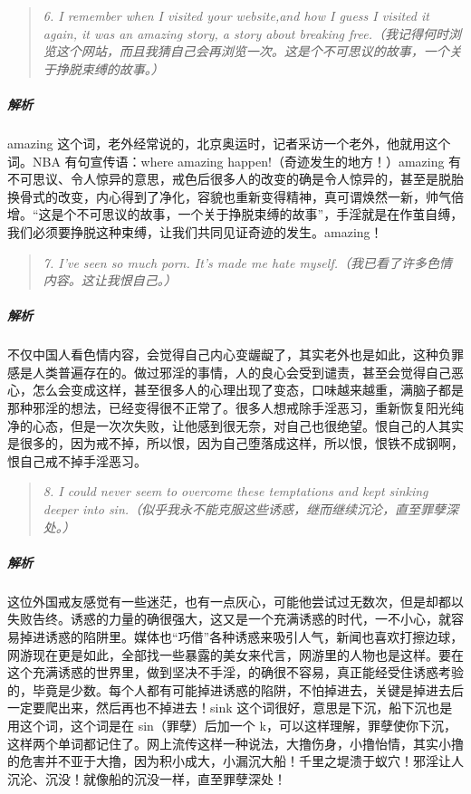 \begin{quote}\it
    6. I remember when I visited your website,and how I guess I visited it again, it was an amazing story, a story about breaking free.（我记得何时浏览这个网站，而且我猜自己会再浏览一次。这是个不可思议的故事，一个关于挣脱束缚的故事。）
\end{quote}

\subparagraph{解析} amazing 这个词，老外经常说的，北京奥运时，记者采访一个老外，他就用这个词。NBA 有句宣传语：where amazing happen!（奇迹发生的地方！）amazing 有不可思议、令人惊异的意思，戒色后很多人的改变的确是令人惊异的，甚至是脱胎换骨式的改变，内心得到了净化，容貌也重新变得精神，真可谓焕然一新，帅气倍增。“这是个不可思议的故事，一个关于挣脱束缚的故事”，手淫就是在作茧自缚，我们必须要挣脱这种束缚，让我们共同见证奇迹的发生。amazing！

\begin{quote}\it
    7. I've seen so much porn. It's made me hate myself.（我已看了许多色情内容。这让我恨自己。）
\end{quote}

\subparagraph{解析} 不仅中国人看色情内容，会觉得自己内心变龌龊了，其实老外也是如此，这种负罪感是人类普遍存在的。做过邪淫的事情，人的良心会受到谴责，甚至会觉得自己恶心，怎么会变成这样，甚至很多人的心理出现了变态，口味越来越重，满脑子都是那种邪淫的想法，已经变得很不正常了。很多人想戒除手淫恶习，重新恢复阳光纯净的心态，但是一次次失败，让他感到很无奈，对自己也很绝望。恨自己的人其实是很多的，因为戒不掉，所以恨，因为自己堕落成这样，所以恨，恨铁不成钢啊，恨自己戒不掉手淫恶习。

\begin{quote}\it
    8. I could never seem to overcome these temptations and kept sinking deeper into sin.（似乎我永不能克服这些诱惑，继而继续沉沦，直至罪孽深处。）
\end{quote}

\subparagraph{解析} 这位外国戒友感觉有一些迷茫，也有一点灰心，可能他尝试过无数次，但是却都以失败告终。诱惑的力量的确很强大，这又是一个充满诱惑的时代，一不小心，就容易掉进诱惑的陷阱里。媒体也“巧借”各种诱惑来吸引人气，新闻也喜欢打擦边球，网游现在更是如此，全部找一些暴露的美女来代言，网游里的人物也是这样。要在这个充满诱惑的世界里，做到坚决不手淫，的确很不容易，真正能经受住诱惑考验的，毕竟是少数。每个人都有可能掉进诱惑的陷阱，不怕掉进去，关键是掉进去后一定要爬出来，然后再也不掉进去！sink 这个词很好，意思是下沉，船下沉也是用这个词，这个词是在 sin（罪孽）后加一个 k，可以这样理解，罪孽使你下沉，这样两个单词都记住了。网上流传这样一种说法，大撸伤身，小撸怡情，其实小撸的危害并不亚于大撸，因为积小成大，小漏沉大船！千里之堤溃于蚁穴！邪淫让人沉沦、沉没！就像船的沉没一样，直至罪孽深处！

